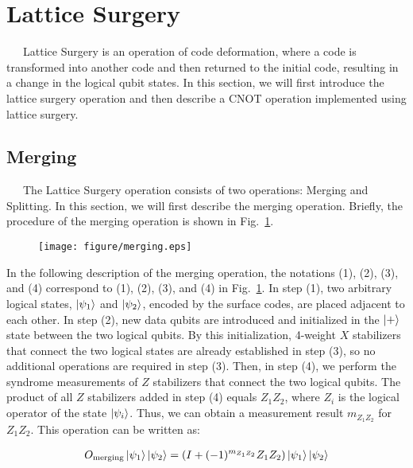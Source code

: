 \documentclass[a4paper,11pt]{ltjsarticle}
\begin{document}
\section{Lattice Surgery}{
    \ \ \ Lattice Surgery \cite{horsman2012} is an operation of code deformation, where a code is transformed into another code and then returned to the initial code, resulting in a change in the logical qubit states. In this section, we will first introduce the lattice surgery operation and then describe a CNOT operation implemented using lattice surgery.

    \subsection{Merging}
    \ \ \ The Lattice Surgery operation consists of two operations: Merging and Splitting. In this section, we will first describe the merging operation. Briefly, the procedure of the merging operation is shown in Fig.~\ref{merging}.
    \begin{figure}[h]
        \centering
        \texttt{[image: figure/merging.eps]}
        \vspace{0pt}\caption{}
        \label{merging}
        \vspace{-10pt}
    \end{figure}

    In the following description of the merging operation, the notations (1), (2), (3), and (4) correspond to (1), (2), (3), and (4) in Fig.~\ref{merging}. In step (1), two arbitrary logical states, $\ket{\psi_1}$ and $\ket{\psi_2}$, encoded by the surface codes, are placed adjacent to each other. In step (2), new data qubits are introduced and initialized in the $\ket{+}$ state between the two logical qubits. By this initialization, 4-weight $X$ stabilizers that connect the two logical states are already established in step (3), so no additional operations are required in step (3). Then, in step (4), we perform the syndrome measurements of $Z$ stabilizers that connect the two logical qubits. The product of all $Z$ stabilizers added in step (4) equals $Z_1Z_2$, where $Z_i$ is the logical operator of the state $\ket{\psi_i}$. Thus, we can obtain a measurement result $m_{Z_1Z_2}$ for $Z_1Z_2$. This operation can be written as:

    \begin{align}
        O_\text{merging}\ket{\psi_1}\ket{\psi_2}=\left(I+(-1)^{m_{Z_1Z_2}}Z_1Z_2\right)\ket{\psi_1}\ket{\psi_2}
    \end{align}

}
\end{document}
